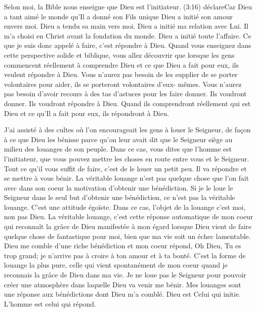 Selon moi, la Bible nous enseigne que Dieu est l’initiateur. (3:16) déclare\frcolon\og Car Dieu a tant aimé le monde qu’Il a
donné son Fils unique\frcolon\fg{} Dieu a initié son amour envers moi. Dieu a tendu sa main vers moi. Dieu a initié ma relation
avec Lui. Il m’a choisi en Christ avant la fondation du monde. Dieu a initié toute l’affaire. Ce que je suis donc appelé
à faire, c’est répondre à Dieu. Quand vous enseignez dans cette perspective solide et biblique, vous allez découvrir
que lorsque les gens commencent réellement à comprendre Dieu et ce que Dieu a fait pour eux, ils veulent répondre
à Dieu. Vous n’aurez pas besoin de les supplier de se porter volontaires pour aider, ils se porteront volontaires d’eux-
mêmes. Vous n’aurez pas besoin d’avoir recours à des tas d'astuces pour les faire donner. Ils voudront donner. Ils
voudront répondre à Dieu. Quand ils comprendront réellement qui est Dieu et ce qu’Il a fait pour eux, ils répondront à
Dieu.

J’ai assisté à des cultes où l'on encourageait les gens à \og louer le Seigneur\fg{}, de façon à ce que Dieu les bénisse parce
qu’on leur avait dit que le Seigneur siège au milieu des louanges de son peuple. Dans ce cas, vous dites que l’homme
est l’initiateur, que vous pouvez mettre les choses en route entre vous et le Seigneur. Tout ce qu'il vous suffit de faire,
c’est de le louer un petit peu. Il va répondre et se mettre à vous bénir. La véritable louange n’est pas quelque chose
que l’on fait avec dans son coeur la motivation d’obtenir une bénédiction. Si je le loue le Seigneur dans le seul but
d’obtenir une bénédiction, ce n’est pas la véritable louange. C’est une attitude égoïste. Dans ce cas, l’objet de la
louange c’est moi, non pas Dieu. La véritable louange, c’est cette réponse automatique de mon coeur qui reconnaît la
grâce de Dieu manifestée à mon égard lorsque Dieu vient de faire quelque chose de fantastique pour moi, bien que
ma vie soit un échec lamentable. Dieu me comble d'une riche bénédiction et mon coeur répond, \og Oh Dieu, Tu es trop
grand; je n’arrive pas à croire à ton amour et à ta bonté.\fg{} C’est la forme de louange la plus pure, celle qui vient
spontanément de mon coeur quand je reconnais la grâce de Dieu dans ma vie. Je ne loue pas le Seigneur pour
pouvoir créer une atmosphère dans laquelle Dieu va venir me bénir. Mes louanges sont une réponse aux bénédictions
dont Dieu m’a comblé. Dieu est Celui qui initie. L’homme est celui qui répond.


